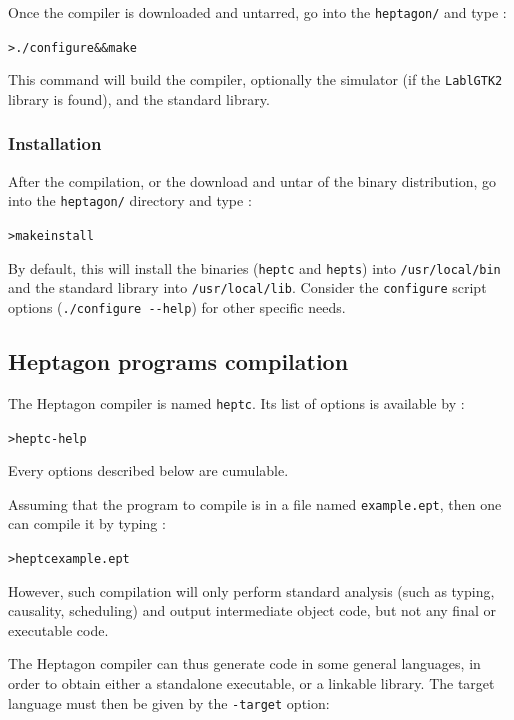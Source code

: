 \documentclass[a4paper]{article}
\begin{document}
Once the compiler is downloaded and untarred, go into the \texttt{heptagon/} and
type :

\begin{alltt}
> ./configure && make
\end{alltt}

This command will build the compiler, optionally the simulator (if the
\texttt{LablGTK2} library is found), and the standard library.

\subsubsection{Installation}
\label{sec:installation}

After the compilation, or the download and untar of the binary distribution, go
into the \texttt{heptagon/} directory and type :

\begin{alltt}
> make install
\end{alltt}

By default, this will install the binaries (\texttt{heptc} and \texttt{hepts}) into
\texttt{/usr/local/bin} and the standard library into
\texttt{/usr/local/lib}. Consider the \texttt{configure} script options
(\verb+./configure --help+) for other specific needs.


\subsection{Heptagon programs compilation}
\label{sec:hept-compilation}

The Heptagon compiler is named \texttt{heptc}. Its list of options is available by
:

\begin{alltt}
> heptc -help
\end{alltt}

Every options described below are cumulable.

Assuming that the program to compile is in a file named \texttt{example.ept},
then one can compile it by typing :

\begin{alltt}
> heptc example.ept
\end{alltt}

However, such compilation will only perform standard analysis (such as typing,
causality, scheduling) and output intermediate object code, but not any final or
executable code.

The Heptagon compiler can thus generate code in some general languages, in order
to obtain either a standalone executable, or a linkable library. The target
language must then be given by the \texttt{-target} option:
\end{document}
